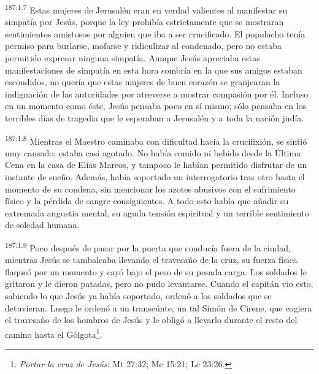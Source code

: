 \par
\textsuperscript{187:1.7} Estas mujeres de Jerusalén eran en verdad valientes al manifestar su simpatía por Jesús, porque la ley prohibía estrictamente que se mostraran sentimientos amistosos por alguien que iba a ser crucificado. El populacho tenía permiso para burlarse, mofarse y ridiculizar al condenado, pero no estaba permitido expresar ninguna simpatía. Aunque Jesús apreciaba estas manifestaciones de simpatía en esta hora sombría en la que sus amigos estaban escondidos, no quería que estas mujeres de buen corazón se granjearan la indignación de las autoridades por atreverse a mostrar compasión por él. Incluso en un momento como éste, Jesús pensaba poco en sí mismo; sólo pensaba en los terribles días de tragedia que le esperaban a Jerusalén y a toda la nación judía.

\par
\textsuperscript{187:1.8} Mientras el Maestro caminaba con dificultad hacia la crucifixión, se sintió muy cansado; estaba casi agotado. No había comido ni bebido desde la Última Cena en la casa de Elías Marcos, y tampoco le habían permitido disfrutar de un instante de sueño. Además, había soportado un interrogatorio tras otro hasta el momento de su condena, sin mencionar los azotes abusivos con el sufrimiento físico y la pérdida de sangre consiguientes. A todo esto había que añadir su extremada angustia mental, su aguda tensión espiritual y un terrible sentimiento de soledad humana.

\par
\textsuperscript{187:1.9} Poco después de pasar por la puerta que conducía fuera de la ciudad, mientras Jesús se tambaleaba llevando el travesaño de la cruz, su fuerza física flaqueó por un momento y cayó bajo el peso de su pesada carga. Los soldados le gritaron y le dieron patadas, pero no pudo levantarse. Cuando el capitán vio esto, sabiendo lo que Jesús ya había soportado, ordenó a los soldados que se detuvieran. Luego le ordenó a un transeúnte, un tal Simón de Cirene, que cogiera el travesaño de los hombros de Jesús y le obligó a llevarlo durante el resto del camino hasta el Gólgota\footnote{\textit{Portar la cruz de Jesús}: Mt 27:32; Mc 15:21; Lc 23:26.}.

